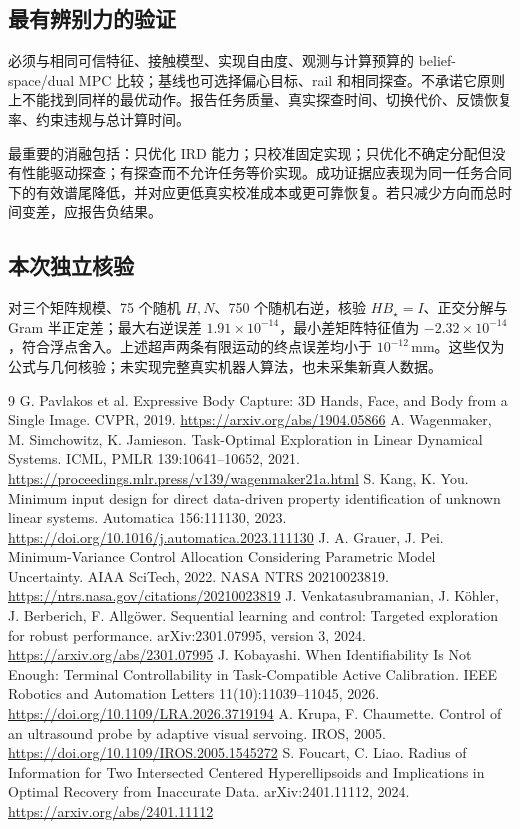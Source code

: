 \documentclass[11pt,a4paper]{article}
\numberwithin{equation}{section}
\theoremstyle{definition}
\begin{document}
\subsection{最有辨别力的验证}
必须与相同可信特征、接触模型、实现自由度、观测与计算预算的 belief-space/dual MPC 比较；基线也可选择偏心目标、rail 和相同探查。不承诺它原则上不能找到同样的最优动作。报告任务质量、真实探查时间、切换代价、反馈恢复率、约束违规与总计算时间。

最重要的消融包括：只优化 IRD 能力；只校准固定实现；只优化不确定分配但没有性能驱动探查；有探查而不允许任务等价实现。成功证据应表现为同一任务合同下的有效谱尾降低，并对应更低真实校准成本或更可靠恢复。若只减少方向而总时间变差，应报告负结果。

\subsection{本次独立核验}
对三个矩阵规模、75 个随机 $H,N$、750 个随机右逆，核验 $HB_\star=I$、正交分解与 Gram 半正定差；最大右逆误差 $1.91\times10^{-14}$，最小差矩阵特征值为 $-2.32\times10^{-14}$，符合浮点舍入。上述超声两条有限运动的终点误差均小于 $10^{-12}\,\mathrm{mm}$。这些仅为公式与几何核验；未实现完整真实机器人算法，也未采集新真人数据。

\begin{thebibliography}{9}
 G. Pavlakos et al. Expressive Body Capture: 3D Hands, Face, and Body from a Single Image. CVPR, 2019. \url{https://arxiv.org/abs/1904.05866}
 A. Wagenmaker, M. Simchowitz, K. Jamieson. Task-Optimal Exploration in Linear Dynamical Systems. ICML, PMLR 139:10641--10652, 2021. \url{https://proceedings.mlr.press/v139/wagenmaker21a.html}
 S. Kang, K. You. Minimum input design for direct data-driven property identification of unknown linear systems. Automatica 156:111130, 2023. \url{https://doi.org/10.1016/j.automatica.2023.111130}
 J. A. Grauer, J. Pei. Minimum-Variance Control Allocation Considering Parametric Model Uncertainty. AIAA SciTech, 2022. NASA NTRS 20210023819. \url{https://ntrs.nasa.gov/citations/20210023819}
 J. Venkatasubramanian, J. K\"ohler, J. Berberich, F. Allg\"ower. Sequential learning and control: Targeted exploration for robust performance. arXiv:2301.07995, version 3, 2024. \url{https://arxiv.org/abs/2301.07995}
 J. Kobayashi. When Identifiability Is Not Enough: Terminal Controllability in Task-Compatible Active Calibration. IEEE Robotics and Automation Letters 11(10):11039--11045, 2026. \url{https://doi.org/10.1109/LRA.2026.3719194}
 A. Krupa, F. Chaumette. Control of an ultrasound probe by adaptive visual servoing. IROS, 2005. \url{https://doi.org/10.1109/IROS.2005.1545272}
 S. Foucart, C. Liao. Radius of Information for Two Intersected Centered Hyperellipsoids and Implications in Optimal Recovery from Inaccurate Data. arXiv:2401.11112, 2024. \url{https://arxiv.org/abs/2401.11112}
\end{thebibliography}
\end{document}
